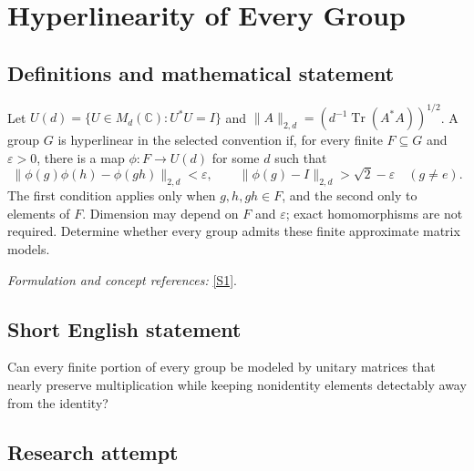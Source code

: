 \documentclass[11pt,a4paper]{article}
\newcommand{\C}{\mathbb{C}}
\newcommand{\eps}{\varepsilon}
\newcommand{\sref}[2]{\hyperlink{source:#1:#2}{[S#2]}}
\newif\ifshowcatalogue
\newcommand{\cataloguescope}[1]{\ifshowcatalogue
 \paragraph{Exact scope in the supplied catalogue.}
 \begin{quote}\small #1\end{quote}\fi}
\numberwithin{equation}{section}
\begin{document}
\setcounter{section}{0}
\clearpage
\section*{\texorpdfstring{Hyperlinearity of Every Group}{Hyperlinearity of Every Group}}\label{statement}
\subsection{Definitions and mathematical statement}
Let $U(d)=\{U\in M_d(\C):U^*U=I\}$ and
$\|A\|_{2,d}=(d^{-1}\operatorname{Tr}(A^*A))^{1/2}$. A group $G$ is hyperlinear in the selected convention if, for every finite $F\subseteq G$ and $\eps>0$, there is a map $\phi:F\to U(d)$ for some $d$ such that
\[
 \|\phi(g)\phi(h)-\phi(gh)\|_{2,d}<\eps,
 \qquad \|\phi(g)-I\|_{2,d}>\sqrt2-\eps\quad(g\ne e).
\]
The first condition applies only when $g,h,gh\in F$, and the second only to elements of $F$. Dimension may depend on $F$ and $\eps$; exact homomorphisms are not required. Determine whether every group admits these finite approximate matrix models.
\par\smallskip\textit{Formulation and concept references:} \sref{statement}{1}.
\cataloguescope{Determine whether every group G is hyperlinear. Precisely, for each finite F contained in G and each epsilon>0, must there be d>=1 and phi:F->U(d) such that ||phi(g)phi(h)-phi(gh)||\_(2,d)<epsilon whenever g,h,gh belong to F, and ||phi(g)-I||\_(2,d)>sqrt(2)-epsilon for every nonidentity g in F? Here ||X||\_(2,d)=(Tr(X*X)/d)\textasciicircum{}(1/2) is the normalized Hilbert-Schmidt norm. A negative resolution is a group failing this condition.}
\subsection{Short English statement}
Can every finite portion of every group be modeled by unitary matrices that nearly preserve multiplication while keeping nonidentity elements detectably away from the identity?
\subsection{Research attempt}
\end{document}
